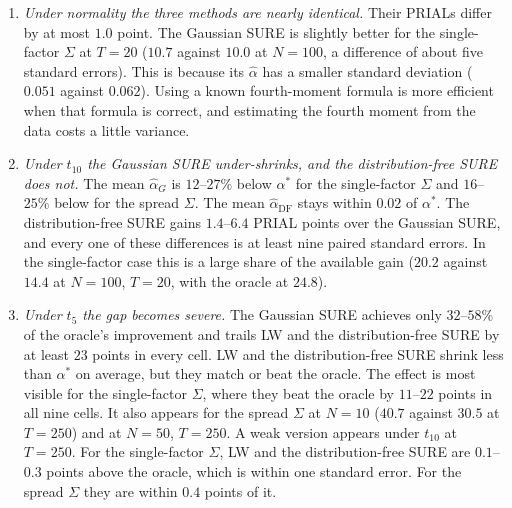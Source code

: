 \begin{enumerate}
  \item \emph{Under normality the three methods are nearly identical.} Their PRIALs differ by at most $1.0$ point. The Gaussian SURE is slightly better for the single-factor $\Sigma$ at $T = 20$ ($10.7$ against $10.0$ at $N = 100$, a difference of about five standard errors). This is because its $\hat\alpha$ has a smaller standard deviation ($0.051$ against $0.062$). Using a known fourth-moment formula is more efficient when that formula is correct, and estimating the fourth moment from the data costs a little variance.
  \item \emph{Under $t_{10}$ the Gaussian SURE under-shrinks, and the distribution-free SURE does not.} The mean $\hat\alpha_G$ is $12$--$27\%$ below $\alpha^*$ for the single-factor $\Sigma$ and $16$--$25\%$ below for the spread $\Sigma$. The mean $\hat\alpha_{\mathrm{DF}}$ stays within $0.02$ of $\alpha^*$. The distribution-free SURE gains $1.4$--$6.4$ PRIAL points over the Gaussian SURE, and every one of these differences is at least nine paired standard errors. In the single-factor case this is a large share of the available gain ($20.2$ against $14.4$ at $N = 100$, $T = 20$, with the oracle at $24.8$).
  \item \emph{Under $t_5$ the gap becomes severe.} The Gaussian SURE achieves only $32$--$58\%$ of the oracle's improvement and trails LW and the distribution-free SURE by at least $23$ points in every cell. LW and the distribution-free SURE shrink less than $\alpha^*$ on average, but they match or beat the oracle. The effect is most visible for the single-factor $\Sigma$, where they beat the oracle by $11$--$22$ points in all nine cells. It also appears for the spread $\Sigma$ at $N = 10$ ($40.7$ against $30.5$ at $T = 250$) and at $N = 50$, $T = 250$. A weak version appears under $t_{10}$ at $T = 250$. For the single-factor $\Sigma$, LW and the distribution-free SURE are $0.1$--$0.3$ points above the oracle, which is within one standard error. For the spread $\Sigma$ they are within $0.4$ points of it.


\end{enumerate}
